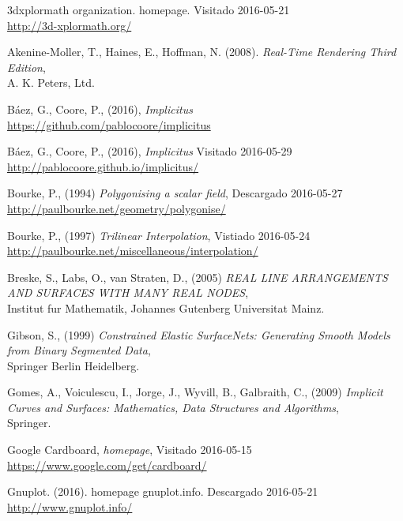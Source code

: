 \documentclass[12pt]{article}
\begin{document}
\begin{thebibliography}{9}

3dxplormath organization. homepage. 
Visitado 2016-05-21 
\\\url{http://3d-xplormath.org/}

Akenine-Moller, T., Haines, E., Hoffman, N. (2008). \textit{Real-Time Rendering Third Edition},\\A. K. Peters, Ltd.

Báez, G., Coore, P., (2016), \textit{Implicitus}
\\\url{https://github.com/pablocoore/implicitus}

Báez, G., Coore, P., (2016), \textit{Implicitus}
Visitado 2016-05-29 
\\\url{http://pablocoore.github.io/implicitus/}

Bourke, P., (1994) \textit{Polygonising a scalar field},
Descargado 2016-05-27 
\\\url{http://paulbourke.net/geometry/polygonise/}

Bourke, P., (1997) \textit{Trilinear Interpolation},
Vistiado 2016-05-24 
\\\url{http://paulbourke.net/miscellaneous/interpolation/}

Breske, S., Labs, O., van Straten, D., (2005) \textit{REAL LINE ARRANGEMENTS AND SURFACES WITH MANY REAL NODES},\\
Institut fur Mathematik, Johannes Gutenberg Universitat Mainz.

Gibson, S., (1999) \textit{Constrained Elastic SurfaceNets: Generating Smooth Models from Binary Segmented Data},\\
Springer Berlin Heidelberg.

Gomes, A., Voiculescu, I., Jorge, J., Wyvill, B., Galbraith, C., (2009) \textit{Implicit Curves and Surfaces: Mathematics, Data Structures and Algorithms},\\
Springer.

Google Cardboard, \textit{homepage},
Visitado 2016-05-15 
\\\url{https://www.google.com/get/cardboard/}

Gnuplot. (2016). homepage gnuplot.info. 
Descargado 2016-05-21 
\\\url{http://www.gnuplot.info/}


\end{thebibliography}
\end{document}

